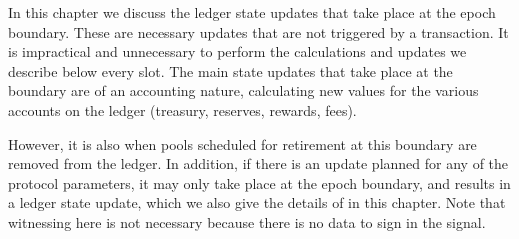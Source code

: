 \newcommand{\UTxOEpState}{\type{UTxOEpState}}
\newcommand{\Accnt}{\type{Accnt}}
\newcommand{\AccntEnv}{\type{AccntEnv}}
\newcommand{\AccntState}{\type{AccntState}}
\newcommand{\StPlCleanEnv}{\type{StPlCleanEnv}}
\newcommand{\StPlCleanState}{\type{StPlCleanState}}
\newcommand{\NewProtoConstsEnv}{\type{NewProtoConstsEnv}}
\newcommand{\NewProtoConstsState}{\type{NewProtoConstsState}}
\newcommand{\EpochEnv}{\type{EpochEnv}}
\newcommand{\EpochState}{\type{EpochState}}
\newcommand{\BlocksMade}{\type{BlocksMade}}
\newcommand{\Stake}{\type{Stake}}
\newcommand{\Avgs}{\type{Avgs}}

\newcommand{\obligation}[4]{\fun{obligation}~ \var{#1}~ \var{#2}~ \var{#3}~ \var{#4}}
\newcommand{\reward}[5]{\fun{reward}~ \var{#1}~ \var{#2}~ \var{#3}~ \var{#4}~ \var{#5}}
\newcommand{\rewardOnePool}[9]{\fun{rewardOnePool}~\var{#1}~\var{#2}~\var{#3}~\var{#4}~\var{#5}~\var{#6}~\var{#7}~\var{#8}~\var{#9}}
\newcommand{\isActive}[4]{\fun{isActive}~ \var{#1}~ \var{#2}~ \var{#3}~ \var{#4}}
\newcommand{\activeStake}[5]{\fun{activeStake}~ \var{#1}~ \var{#2}~ \var{#3}~ \var{#4}~ \var{#5}}
\newcommand{\poolRefunds}[3]{\fun{poolRefunds}~ \var{#1}~ \var{#2}~ \var{#3}}
\newcommand{\poolStake}[4]{\fun{poolStake}~ \var{#1}~ \var{#2}~ \var{#3}~ \var{#4}}
\newcommand{\poolDistr}[3]{\fun{poolDistr}~ \var{#1}~ \var{#2}~ \var{#3}}
\newcommand{\lReward}[4]{\fun{r_{leader}}~ \var{#1}~ \var{#2}~ \var{#3}~ {#4}}
\newcommand{\mReward}[4]{\fun{r_{member}}~ \var{#1}~ \var{#2}~ \var{#3}~ {#4}}
\newcommand{\poolReward}[6]{\fun{poolReward}~\var{#1}~\var{#2}~\var{#3}~\var{#4}~\var{#5}~\var{#6}}
\newcommand{\movingAvg}[5]{\fun{movingAvg}~ \var{#1}~ \var{#2}~ \var{#3}~ \var{#4}~ \var{#5}}
\newcommand{\updateAvgs}[4]{\fun{updateAvgs}~ \var{#1}~ \var{#2}~ \var{#3}~ \var{#4}}

In this chapter we discuss the ledger state updates that take place at the epoch
boundary. These are necessary updates that are not triggered by a transaction.
It is impractical and unnecessary to perform the calculations and updates we
describe below every slot. The main state updates that take place at the boundary
are of an accounting nature, calculating new values for the various accounts
on the ledger (treasury, reserves, rewards, fees).

However, it is also when
pools scheduled for retirement at this boundary are removed from the ledger.
In addition, if there is an update planned for any of the protocol parameters,
it may only take place at the epoch boundary, and results in a ledger state
update, which we also give the details of in this chapter.
Note that witnessing here is not necessary because there is no data to sign
in the signal.

